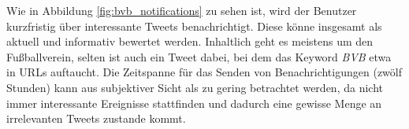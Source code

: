 %
Wie in Abbildung \ref{fig:bvb_notifications} zu sehen ist, wird der Benutzer kurzfristig über interessante Tweets benachrichtigt. Diese könne insgesamt als aktuell und informativ bewertet werden. Inhaltlich geht es meistens um den Fußballverein, selten ist auch ein Tweet dabei, bei dem das Keyword \textit{BVB} etwa in URLs auftaucht. Die Zeitspanne für das Senden von Benachrichtigungen (zwölf Stunden) kann aus subjektiver Sicht als zu gering betrachtet werden, da nicht immer interessante Ereignisse stattfinden und dadurch eine gewisse Menge an irrelevanten Tweets zustande kommt.









